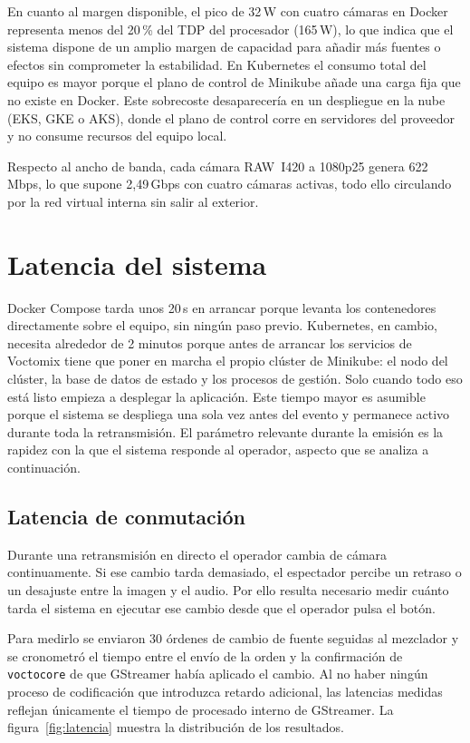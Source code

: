 En cuanto al margen disponible, el pico de 32\,W con cuatro cámaras en Docker
representa menos del 20\,\% del \ac{TDP} del procesador (165\,W), lo que
indica que el sistema dispone de un amplio margen de capacidad para añadir más fuentes o
efectos sin comprometer la estabilidad. En Kubernetes el consumo total del
equipo es mayor porque el plano de control de Minikube añade una carga fija
que no existe en Docker. Este sobrecoste desaparecería en un despliegue en la
nube (\ac{EKS}, \ac{GKE} o \ac{AKS}), donde el plano de control corre en
servidores del proveedor y no consume recursos del equipo local.

Respecto al ancho de banda, cada cámara RAW~I420 a 1080p25 genera 622\,Mbps,
lo que supone 2{,}49\,Gbps con cuatro cámaras activas, todo ello circulando
por la red virtual interna sin salir al exterior.

\section{Latencia del sistema}
\label{sec:latencia_sistema}

Docker Compose tarda unos 20\,s en arrancar porque levanta los
contenedores directamente sobre el equipo, sin ningún paso previo.
Kubernetes, en cambio, necesita alrededor de 2 minutos porque antes de arrancar
los servicios de Voctomix tiene que poner en marcha el propio clúster de
Minikube: el nodo del clúster, la base de datos de estado y los procesos de
gestión. Solo cuando todo eso está listo empieza a desplegar la aplicación.
Este tiempo mayor es asumible porque el sistema se despliega una
sola vez antes del evento y permanece activo durante toda la retransmisión.
El parámetro relevante durante la emisión es la rapidez con la que el sistema
responde al operador, aspecto que se analiza a continuación.

\subsection{Latencia de conmutación}
\label{sec:latencia_conmutacion}

Durante una retransmisión en directo el operador cambia de cámara
continuamente. Si ese cambio tarda demasiado, el espectador percibe un retraso
o un desajuste entre la imagen y el audio. Por ello resulta necesario medir cuánto tarda
el sistema en ejecutar ese cambio desde que el operador pulsa el botón.

Para medirlo se enviaron 30 órdenes de cambio de fuente seguidas al mezclador
y se cronometró el tiempo entre el envío de la orden y la confirmación de
\texttt{voctocore} de que GStreamer había aplicado el cambio. Al no haber ningún proceso
de codificación que introduzca retardo adicional, las latencias medidas reflejan
únicamente el tiempo de procesado interno de GStreamer.
La figura~\ref{fig:latencia} muestra la distribución de los resultados.

